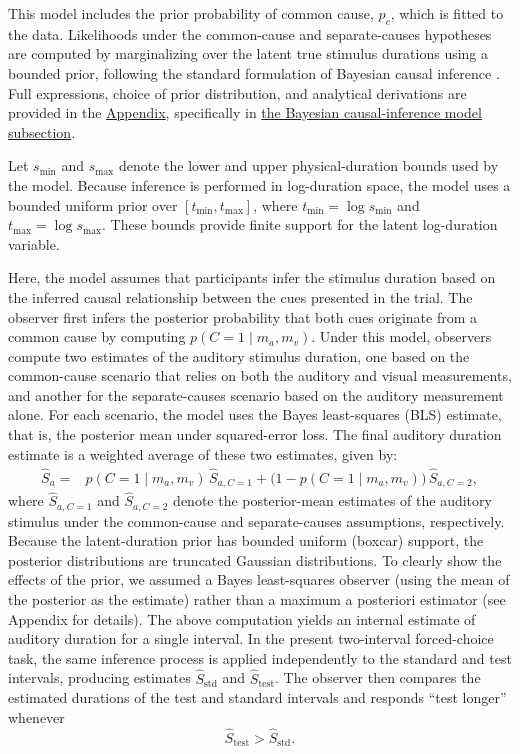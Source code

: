 \documentclass{biorxiv}
\providecommand{\citep}[1]{\cite{#1}}
\begin{document}
This model includes the prior probability of common cause, $p_c$, which is fitted to the data. Likelihoods under the common-cause and separate-causes hypotheses are computed by marginalizing over the latent true stimulus durations using a bounded prior, following the standard formulation of Bayesian causal inference \citep{kording2007causal}. Full expressions, choice of prior distribution, and analytical derivations are provided in the \hyperref[app:appendix]{Appendix}, specifically in \hyperref[causal_inf_equations]{the Bayesian causal-inference model subsection}.

Let $s_{\min}$ and $s_{\max}$ denote the lower and upper physical-duration bounds used by the model. Because inference is performed in log-duration space, the model uses a bounded uniform prior over $[t_{\min},t_{\max}]$, where $t_{\min}=\log s_{\min}$ and $t_{\max}=\log s_{\max}$. These bounds provide finite support for the latent log-duration variable.

Here, the model assumes that participants infer the stimulus duration based on the inferred causal relationship between the cues presented in the trial. The observer first infers the posterior probability that both cues originate from a common cause by computing $p(C = 1 \mid m_a, m_v)$. Under this model, observers compute two estimates of the auditory stimulus duration, one based on the common-cause scenario that relies on both the auditory and visual measurements, and another for the separate-causes scenario based on the auditory measurement alone. For each scenario, the model uses the Bayes least-squares (BLS) estimate, that is, the posterior mean under squared-error loss. The final auditory duration estimate is a weighted average of these two estimates, given by:
\begin{align}
\hat S_{a}
= {}& p(C=1 \mid m_a,m_v)\,\hat S_{a,C=1}
+ \bigl(1 - p(C=1 \mid m_a,m_v)\bigr)\,
   \hat S_{a,C=2},
\label{eq:estimate_model_avg}
\end{align}
where $\hat S_{a,C=1}$ and $\hat S_{a,C=2}$ denote the posterior-mean estimates of the auditory stimulus under the common-cause and separate-causes assumptions, respectively. Because the latent-duration prior has bounded uniform (boxcar) support, the posterior distributions are truncated Gaussian distributions. To clearly show the effects of the prior, we assumed a Bayes least-squares observer (using the mean of the posterior as the estimate) rather than a maximum a posteriori estimator (see Appendix for details).
The above computation yields an internal estimate of auditory duration for a single interval. In the present two-interval forced-choice task, the same inference process is applied independently to the standard and test intervals, producing estimates $\hat S_{\mathrm{std}}$ and $\hat S_{\mathrm{test}}$. The observer then compares the estimated durations of the test and standard intervals and responds ``test longer'' whenever
\begin{equation}
\hat S_{\mathrm{test}} > \hat S_{\mathrm{std}}.
\end{equation}
\end{document}
